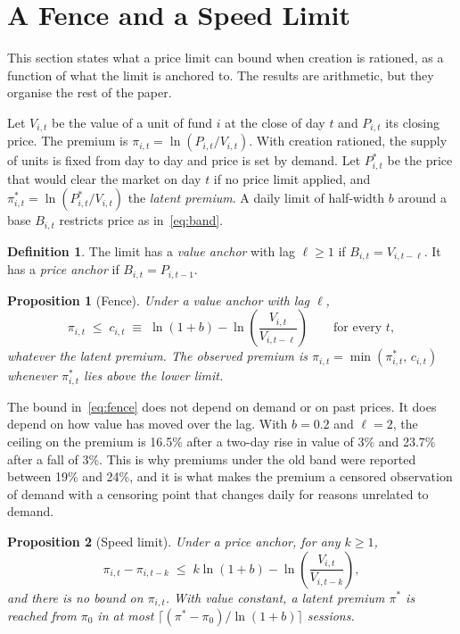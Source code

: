 \documentclass[11pt,a4paper]{article}
\newtheorem{proposition}{Proposition}
\theoremstyle{definition}
\newtheorem{definition}{Definition}
\begin{document}
\section{A Fence and a Speed Limit}\label{sec:framework}
This section states what a price limit can bound when creation is rationed, as a function of what the limit is anchored to. The results are arithmetic, but they organise the rest of the paper.

Let $V_{i,t}$ be the value of a unit of fund $i$ at the close of day $t$ and $P_{i,t}$ its closing price. The premium is $\pi_{i,t}=\ln(P_{i,t}/V_{i,t})$. With creation rationed, the supply of units is fixed from day to day and price is set by demand. Let $P^{*}_{i,t}$ be the price that would clear the market on day $t$ if no price limit applied, and $\pi^{*}_{i,t}=\ln(P^{*}_{i,t}/V_{i,t})$ the \emph{latent premium}. A daily limit of half-width $b$ around a base $B_{i,t}$ restricts price as in~\eqref{eq:band}.

\begin{definition}
The limit has a \emph{value anchor} with lag $\ell\ge 1$ if $B_{i,t}=V_{i,t-\ell}$. It has a \emph{price anchor} if $B_{i,t}=P_{i,t-1}$.
\end{definition}

\begin{proposition}[Fence]\label{prop:fence}
Under a value anchor with lag $\ell$,
\begin{equation}\label{eq:fence}
\pi_{i,t}\;\le\;c_{i,t}\;\equiv\;\ln(1+b)-\ln\!\left(\frac{V_{i,t}}{V_{i,t-\ell}}\right)\qquad\text{for every } t,
\end{equation}
whatever the latent premium. The observed premium is $\pi_{i,t}=\min(\pi^{*}_{i,t},\,c_{i,t})$ whenever $\pi^{*}_{i,t}$ lies above the lower limit.
\end{proposition}

The bound in~\eqref{eq:fence} does not depend on demand or on past prices. It does depend on how value has moved over the lag. With $b=0.2$ and $\ell=2$, the ceiling on the premium is 16.5\% after a two-day rise in value of 3\% and 23.7\% after a fall of 3\%. This is why premiums under the old band were reported between 19\% and 24\%, and it is what makes the premium a censored observation of demand with a censoring point that changes daily for reasons unrelated to demand.

\begin{proposition}[Speed limit]\label{prop:speed}
Under a price anchor, for any $k\ge 1$,
\begin{equation}\label{eq:speed}
\pi_{i,t}-\pi_{i,t-k}\;\le\;k\ln(1+b)-\ln\!\left(\frac{V_{i,t}}{V_{i,t-k}}\right),
\end{equation}
and there is no bound on $\pi_{i,t}$. With value constant, a latent premium $\pi^{*}$ is reached from $\pi_{0}$ in at most $\lceil(\pi^{*}-\pi_{0})/\ln(1+b)\rceil$ sessions.
\end{proposition}
\end{document}
